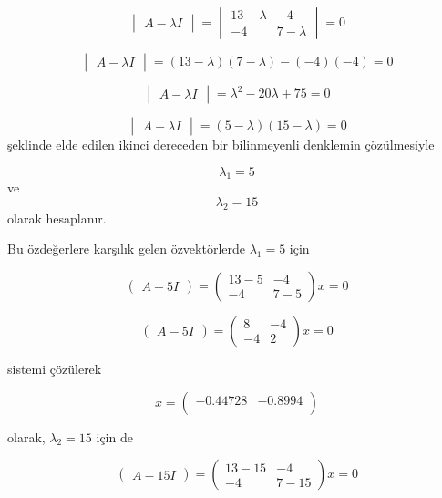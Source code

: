 \documentclass[
]{book}
\begin{document}
\[\begin{vmatrix}
 A-\lambda I 
\end{vmatrix}
= 
\begin{vmatrix}
 13-\lambda & -4 \\
 -4 & 7-\lambda 
\end{vmatrix}
= 0\]

\[\begin{vmatrix}
 A-\lambda I 
\end{vmatrix}
= 
(13-\lambda)(7-\lambda) - (-4)(-4)  
= 0\]

\[\begin{vmatrix}
 A-\lambda I 
\end{vmatrix}
= 
\lambda^2-20\lambda+75
= 0\]

\[\begin{vmatrix}
 A-\lambda I 
\end{vmatrix}
= 
(5-\lambda)(15-\lambda)
= 0\]
şeklinde elde edilen ikinci dereceden bir bilinmeyenli denklemin çözülmesiyle

\[\lambda_1=5\] ve \[\lambda_2=15\]
olarak hesaplanır.

Bu özdeğerlere karşılık gelen özvektörlerde \(\lambda_1=5\) için

\[\begin{pmatrix}
 A-5 I 
\end{pmatrix}
= 
\begin{pmatrix}
 13-5 & -4 \\
 -4 & 7-5 
\end{pmatrix}x 
= 0\]

\[\begin{pmatrix}
 A-5 I 
\end{pmatrix}
= 
\begin{pmatrix}
 8 & -4 \\
 -4 & 2 
\end{pmatrix}x 
=0\]

sistemi çözülerek

\[x = 
\begin{pmatrix}
 -0.44728 & -0.8994 \\
\end{pmatrix}\]

olarak, \(\lambda_2=15\) için de

\[\begin{pmatrix}
 A-15 I 
\end{pmatrix}
= 
\begin{pmatrix}
 13-15 & -4 \\
 -4 & 7-15 
\end{pmatrix}x 
=0\]
\end{document}
